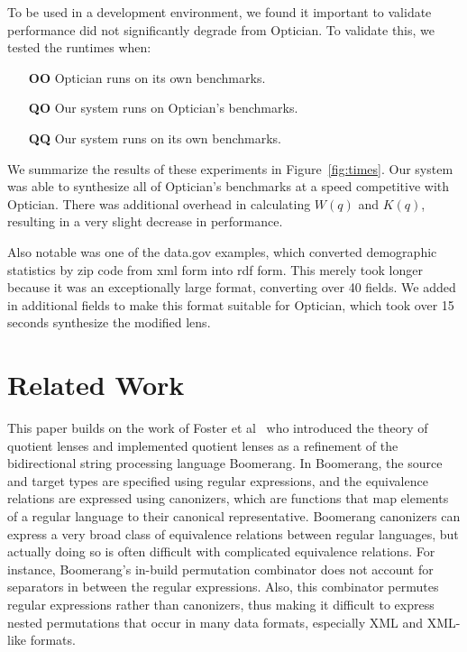 \documentclass[acmsmall,review,anonymous]{acmart}
\newcommand{\FINISH}[3]{\ifdraft\textcolor{#1}{[#2: #3]}\fi}
\newcommand{\sam}[1]{\FINISH{dkpurple}{SM}{#1}}
\newcommand{\OpticianRuntime}{\textbf{OO}}
\newcommand{\SystemOnOptician}{\textbf{QO}}
\newcommand{\SystemOnBenchmarks}{\textbf{QQ}}
\begin{document}
To be used in a development environment, we found it important to validate
performance did not significantly degrade from Optician. To validate this, we
tested the runtimes when:
\begin{itemize}
  \item[\OpticianRuntime{}] Optician runs on its own benchmarks.
  \item[\SystemOnOptician{}] Our system runs on Optician's benchmarks.
  \item[\SystemOnBenchmarks{}] Our system runs on its own benchmarks.
\end{itemize}

We summarize the results of these experiments in Figure~\ref{fig:times}.
Our system was
able to synthesize all of Optician's benchmarks at a speed competitive with
Optician.  There was additional overhead in calculating $W(q)$ and $K(q)$,
resulting in a very slight decrease in performance.

Also notable was one of the data.gov examples, which converted demographic
statistics by zip code from xml form into rdf form. This merely took longer
because it was an exceptionally large format, converting over 40 fields. We
added in additional fields to make this format suitable for Optician, which
took over 15 seconds synthesize the modified lens.

\section{Related Work}
\label{relwork}

This paper builds on the work of Foster et al~\cite{quotientlenses} who
introduced the theory of quotient lenses and implemented quotient lenses as a
refinement of the bidirectional string processing language Boomerang.
In Boomerang, the source and target types are specified using regular
expressions, and the equivalence relations are expressed using canonizers, which
are functions that map elements of a regular language to their canonical
representative. Boomerang canonizers can express a very broad class of
equivalence relations between regular languages, but actually doing so is often
difficult with complicated equivalence relations. For instance, Boomerang's
in-build permutation combinator does not account for separators in between the
regular expressions. Also, this combinator permutes regular expressions rather
than canonizers, thus making it difficult to express nested permutations that
occur in many data formats, especially XML and XML-like formats.
\end{document}
